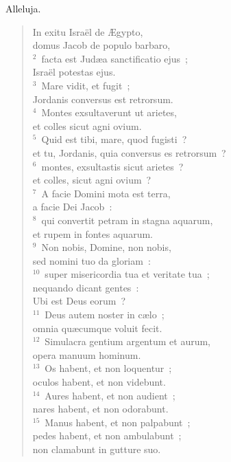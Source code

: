 \lettrine[lines=3,image=true,loversize=0.05,lraise=-0.03]{A}{}lleluja. \begin{flushleft}\begin{verse}\vspace{6pt}In exitu Isra\"el de \AE gypto,\\ domus Jacob de populo barbaro,\\
${}^{2}$~facta est Jud\ae a sanctificatio ejus~;\\ Isra\"el potestas ejus.\\
${}^{3}$~Mare vidit, et fugit~;\\ Jordanis conversus est retrorsum.\\
${}^{4}$~Montes exsultaverunt ut arietes,\\ et colles sicut agni ovium.\\
${}^{5}$~Quid est tibi, mare, quod fugisti~?\\ et tu, Jordanis, quia conversus es retrorsum~?\\
${}^{6}$~montes, exsultastis sicut arietes~?\\ et colles, sicut agni ovium~?\\
${}^{7}$~A facie Domini mota est terra,\\ a facie Dei Jacob~:\\
${}^{8}$~qui convertit petram in stagna aquarum,\\ et rupem in fontes aquarum.\\
${}^{9}$~Non nobis, Domine, non nobis,\\ sed nomini tuo da gloriam~:\\
${}^{10}$~super misericordia tua et veritate tua~;\\ nequando dicant gentes~:\\ Ubi est Deus eorum~?\\
${}^{11}$~Deus autem noster in c\ae lo~;\\ omnia qu\ae cumque voluit fecit.\\
${}^{12}$~Simulacra gentium argentum et aurum,\\ opera manuum hominum.\\
${}^{13}$~Os habent, et non loquentur~;\\ oculos habent, et non videbunt.\\
${}^{14}$~Aures habent, et non audient~;\\ nares habent, et non odorabunt.\\
${}^{15}$~Manus habent, et non palpabunt~;\\ pedes habent, et non ambulabunt~;\\ non clamabunt in gutture suo.\\

\end{verse}
\end{flushleft}
